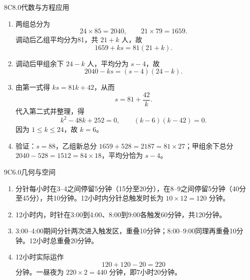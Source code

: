 \begin{solution}{8}{C}{8.0}{代数与方程应用}
\begin{enumerate}[label=\textbf{Step \arabic*:},leftmargin=*]
\item 两组总分为
\[
  24\times85=2040,\qquad 21\times79=1659.
\]
调动后乙组平均分为81，共 \(21+k\) 人，故
\[
  1659+ks=81(21+k).
\]
\item 调动后甲组余下 \(24-k\) 人，平均分为 \(s-4\)，故
\[
  2040-ks=(s-4)(24-k).
\]
\item 由第一式得 \(ks=81k+42\)，从而
\[
  s=81+\frac{42}{k}.
\]
代入第二式并整理，得
\[
  k^2-48k+252=0,\qquad (k-6)(k-42)=0.
\]
因为 \(1\le k\le24\)，故 \(k=6\)。
\item 验证：\(s=88\)，乙组新总分 \(1659+528=2187=81\times27\)；甲组余下总分 \(2040-528=1512=84\times18\)，平均分恰为 \(s-4\)。
\end{enumerate}
\end{solution}

\begin{solution}{9}{C}{6.0}{几何与空间}
\begin{enumerate}[label=\textbf{Step \arabic*:},leftmargin=*]
\item 分针每小时在3--4之间停留5分钟（15分至20分），在8--9之间停留5分钟（40分至45分），共10分钟。12小时内分针总触发时长为 \(10\times12=120\) 分钟。
\item 12小时内，时针在3:00到4:00、8:00到9:00各触发60分钟，共120分钟。
\item 3:00--4:00期间分针两次进入触发区，重叠10分钟；8:00--9:00同理再重叠10分钟。12小时总重叠20分钟。
\item 12小时实际运作
\[
  120+120-20=220
\]
分钟。一昼夜为 \(220\times2=440\) 分钟，即7小时20分钟。
\end{enumerate}
\end{solution}

